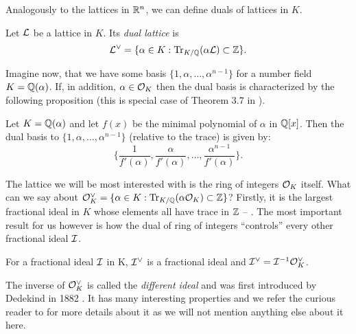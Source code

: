 Analogously to the lattices in $\mathbb{R}^n$, we can define duals of lattices in $K$.
\begin{definition}
	Let $\mathcal{L}$ be a lattice in $K$. Its \textit{dual lattice} is
	\[\mathcal{L}^{\vee} = \{ \alpha \in K : \Tr_{K/\mathbb{Q}}(\alpha \mathcal{L}) \subset \mathbb{Z} \}.\]
\end{definition}
Imagine now, that we have some basis $\{1, \alpha, \ldots, \alpha^{n-1} \}$ for a number field $K = \mathbb{Q}(\alpha)$. If, in addition, $\alpha \in \mathcal{O}_K$ then the dual basis is characterized by the following proposition (this is special case of Theorem 3.7 in \cite{conrad}).
\begin{proposition}\label{d-basis}
	Let $K = \mathbb{Q}(\alpha)$ and let $f(x)$ be the minimal polynomial of $\alpha$ in $\mathbb{Q}[x]$. Then the dual basis to $\{1, \alpha, \ldots, \alpha^{n-1} \}$ (relative to the trace) is given by:
\[\biggl\{ \frac{1}{f'(\alpha)}, \frac{\alpha}{f'(\alpha)}, \ldots, \frac{\alpha^{n-1}}{f'(\alpha)} \biggr\} . \]
\end{proposition}
The lattice we will be most interested with is the ring of integers $\mathcal{O}_K$ itself. What can we say about $\mathcal{O}^{\vee}_K = \{ \alpha \in K : \Tr_{K/\mathbb{Q}}(\alpha \mathcal{O}_K) \subset \mathbb{Z} \}$? Firstly, it is the largest fractional ideal in $K$ whose elements all have trace in $\mathbb{Z}$ -- \cite{conrad}. The most important result for us however is how the dual of ring of integers ``controls'' every other fractional ideal $\mathcal{I}$.
\begin{proposition}
	For a fractional ideal $\mathcal{I}$ in K, $\mathcal{I}^{\vee}$ is a fractional ideal and $\mathcal{I}^{\vee} = \mathcal{I}^{-1} \mathcal{O}^{\vee}_K$.
\end{proposition}
\begin{remark}
The inverse of $\mathcal{O}^{\vee}_K$ is called the \textit{different ideal} and was first introduced by Dedekind in 1882 \cite{dedekind}. It has many interesting properties and we refer the curious reader to \cite{conrad} for more details about it as we will not mention anything else about it here.
\end{remark}






